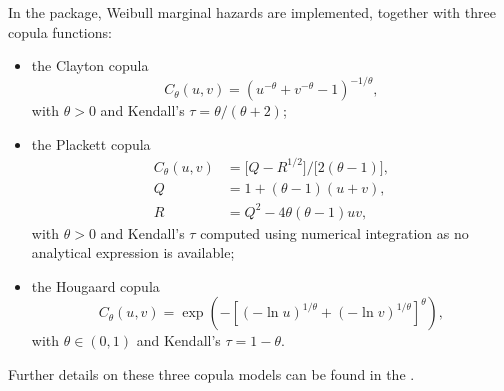 \documentclass[]{scrartcl}\usepackage[]{graphicx}\usepackage[]{color}
\begin{document}
{{In the  package,
  Weibull marginal hazards are implemented,
  together with three copula functions:
  \begin{itemize}
    \item the Clayton copula \citep{Clayton78}
      \begin{equation}
        C_\theta(u, v)= \left(u^{-\theta} + v^{-\theta} - 1\right)^{-1/\theta},
        \label{eq:clayton}
      \end{equation}
      with $\theta > 0$
      and Kendall's $\tau = \theta/(\theta+2)$;
    \item the Plackett copula \citep{Plackett65}
      \begin{align}
        C_\theta(u,v) &= \big[ Q - R^{1/2} \big] / \big[2 (\theta - 1) \big],\\
        Q &= 1 +(\theta-1)(u+v), \nonumber\\
        R &= Q^2 - 4 \theta(\theta-1)uv, \nonumber
      \end{align}
      with $\theta > 0$ and Kendall's $\tau$ computed using numerical integration
      as no analytical expression is available;
    \item the Hougaard copula \citep{Hougaard86}
      \begin{equation}
        C_\theta(u,v) = \exp\left(-\left[(- \ln u)^{1/\theta} +
        (- \ln v)^{1/\theta}\right]^\theta \right),
      \end{equation}
      with $\theta \in (0, 1)$ 
      and Kendall's $\tau = 1 - \theta$.
  \end{itemize}
Further details on these three copula models can be found in the 
  .

}}
\end{document}
